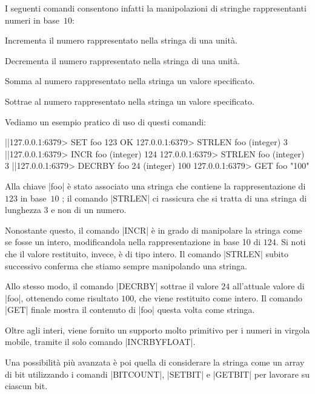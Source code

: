 I seguenti comandi consentono infatti la manipolazioni di stringhe rappresentanti numeri in base~$10$:

\begin{description}[style=nextline,font={\bfseries\ttfamily}]
	\item[INCR <key>] Incrementa il numero rappresentato nella stringa di una unità.
	\item[DECR <key>] Decrementa il numero rappresentato nella stringa di una unità.
	\item[INCRBY <key> <val>] Somma al numero rappresentato nella stringa un valore
	spe\-ci\-fi\-ca\-to.
	\item[DECRBY <key> <val>] Sottrae al numero rappresentato nella stringa un valore
	spe\-ci\-fi\-ca\-to.
\end{description}

Vediamo un esempio pratico di uso di questi comandi:

\begin{commentedsource}[style=redis]
|\lnote|127.0.0.1:6379> SET foo 123
OK
127.0.0.1:6379> STRLEN foo
(integer) 3
|\lnote|127.0.0.1:6379> INCR foo
(integer) 124
127.0.0.1:6379> STRLEN foo
(integer) 3
|\lnote|127.0.0.1:6379> DECRBY foo 24
(integer) 100
127.0.0.1:6379> GET foo
"100"
\end{commentedsource}

Alla chiave \cverb|foo| è stato associato una stringa che contiene la rappresentazione di $123$
in base~$10$ ; il comando \cverb|STRLEN| ci rassicura che si tratta di una stringa di
lunghezza $3$ e non di un numero.

Nonostante questo, il comando \cverb|INCR|  è in grado di manipolare la stringa come
se fosse un intero, modificandola nella rappresentazione in base 10 di $124$. Si noti che il
valore restituito, invece, è di tipo intero. Il comando \cverb|STRLEN| subito successivo conferma
che stiamo sempre manipolando una stringa.

Allo stesso modo, il comando \cverb|DECRBY|  sottrae il valore $24$ all'attuale valore
di \cverb|foo|, ottenendo come risultato $100$, che viene restituito come intero. Il comando
\cverb|GET| finale mostra il contenuto di \cverb|foo| questa volta come stringa.

Oltre agli interi, viene fornito un supporto molto primitivo per i numeri in virgola
mobile, tramite il solo comando \cverb|INCRBYFLOAT|. 

Una possibilità più avanzata è poi quella di considerare la stringa come un array di bit utilizzando
i comandi \cverb|BITCOUNT|, \cverb|SETBIT| e \cverb|GETBIT| per lavorare su ciascun bit.

